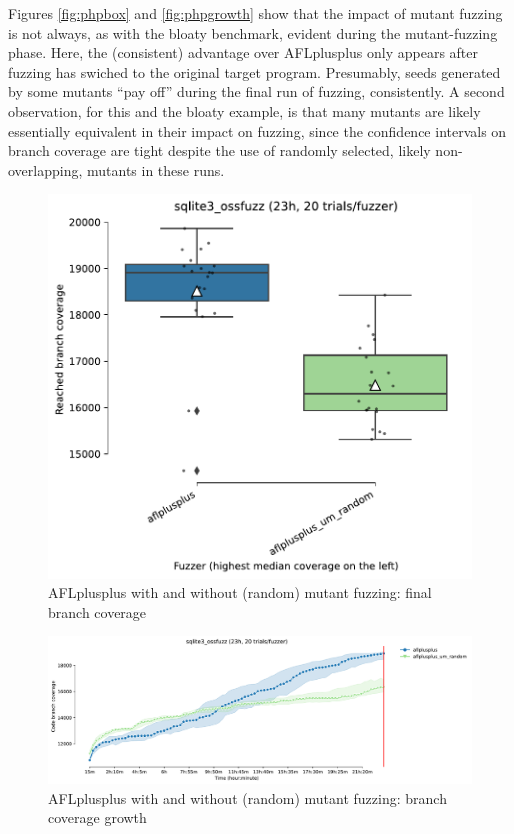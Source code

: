Figures \ref{fig:phpbox} and \ref{fig:phpgrowth} show that the impact of mutant fuzzing is not always, as with the bloaty benchmark, evident during the mutant-fuzzing phase.  Here, the (consistent) advantage over AFLplusplus only appears after fuzzing has swiched to the original target program.  Presumably, seeds generated by some mutants ``pay off'' during the final run of fuzzing, consistently.  A second observation, for this and the bloaty example, is that many mutants are likely essentially equivalent in their impact on fuzzing, since the confidence intervals on branch coverage are tight despite the use of randomly selected, likely non-overlapping, mutants in these runs.

\begin{figure}
  \includegraphics[width=0.75\columnwidth]{sqlite3_ossfuzz_boxplot.pdf}
  \caption{AFLplusplus with and without (random) mutant fuzzing: final branch coverage}
  \label{fig:sqlitebox}
  
\end{figure}

\begin{figure}
  \includegraphics[width=0.75\columnwidth]{sqlite3_ossfuzz_coverage_growth.pdf}
  \caption{AFLplusplus with and without (random) mutant fuzzing: branch coverage growth}
  \label{fig:sqlitegrowth}  
\end{figure}


